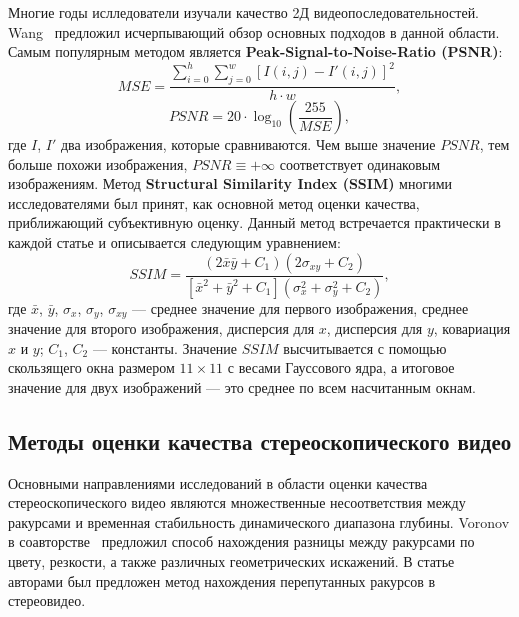 \documentclass[14pt, a4paper]{extarticle}
\begin{document}
Многие годы ислледователи изучали качество 2Д видеопоследовательностей. 
Wang~\cite{wang2006survey} предложил исчерпывающий обзор основных подходов в данной области.
Самым популярным методом является \textbf{Peak-Signal-to-Noise-Ratio (PSNR)}:
\begin{equation*}
	MSE = \frac{\sum_{i=0}^{h}\sum_{j=0}^{w}[I(i, j) - I'(i, j)]^2}{h \cdot w},
\end{equation*}
\begin{equation}
	PSNR = 20 \cdot \log_{10}(\frac{255}{MSE}),
\end{equation}
где $I$, $I'$ два изображения, которые сравниваются. Чем выше значение $PSNR$, 
тем больше похожи изображения, $PSNR \equiv +\infty$ соответствует одинаковым изображениям. 
Метод \textbf{Structural Similarity Index (SSIM)} многими исследователями был принят, 
как основной метод оценки качества, приближающий субъективную оценку. Данный метод встречается
практически в каждой статье и описывается следующим уравнением:
\begin{equation}
	SSIM = \frac{(2\bar{x}\bar{y} + C_1)(2\sigma_{xy} + C_	2)}{[\bar{x}^2 + \bar{y}^2 + C_1](\sigma_x^2 + \sigma_y^2 + C_2)},
\end{equation} 
где $\bar{x}$, $\bar{y}$, $\sigma_x$, $\sigma_y$, $\sigma_{xy}$ --- среднее значение 
для первого изображения, среднее значение для второго изображения, дисперсия для $x$, 
дисперсия для $y$, ковариация $x$ и $y$; $C_1$, $C_2$ --- константы. Значение $SSIM$ 
высчитывается с помощью скользящего окна размером $11 \times 11$ с весами Гауссового ядра, 
а итоговое значение для двух изображений --- это среднее по всем насчитанным окнам.

\subsection{Методы оценки качества стереоскопического видео}

Основными направлениями исследований в области оценки качества стереоскопического видео 
являются множественные несоответствия между ракурсами и временная стабильность 
динамического диапазона глубины. Voronov в соавторстве~\cite{voronov2012towards} предложил
способ нахождения разницы между ракурсами по цвету, резкости, 
а также различных геометрических искажений. В статье~\cite{akimov2012automatic} авторами 
был предложен метод нахождения перепутанных ракурсов в стереовидео. 
\end{document}
